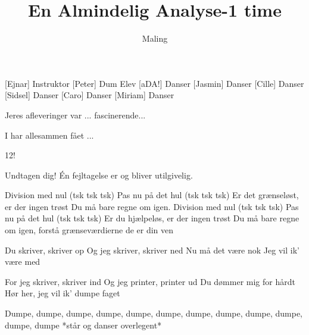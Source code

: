 \documentclass[a4paper,11pt]{article}
\title{En Almindelig Analyse-1 time}
\author{Maling}
\begin{document}
\maketitle

\begin{roles}
[Ejnar] Instruktor
[Peter] Dum Elev
[aDA!] Danser
[Jasmin] Danser
[Cille] Danser
[Sidsel] Danser
[Caro] Danser
[Miriam] Danser
\end{roles}

 \begin{props}
 \end{props}


\begin{song}

Jeres afleveringer var ... fascinerende...

I har allesammen fået ...


12!


Undtagen dig! Én fejltagelse er og bliver utilgivelig.


 Division med nul (tsk tsk tsk) 
Pas nu på det hul (tsk tsk tsk) 
Er det grænseløst, er der ingen trøst 
Du må bare regne om igen. 
Division med nul (tsk tsk tsk) 
Pas nu på det hul (tsk tsk tsk) 
Er du hjælpeløs, er der ingen trøst 
Du må bare regne om igen, 
forstå grænseværdierne de er din ven


 Du skriver, skriver op 
Og jeg skriver, skriver ned 
Nu må det være nok 
Jeg vil ik’ være med 

For jeg skriver, skriver ind 
Og jeg printer, printer ud 
Du dømmer mig for hårdt 
Hør her, jeg vil ik’ dumpe faget

 Dumpe, dumpe, dumpe, dumpe, dumpe, dumpe, dumpe, dumpe, dumpe, dumpe, dumpe, dumpe *står og danser overlegent*


\end{song}
\end{document}
